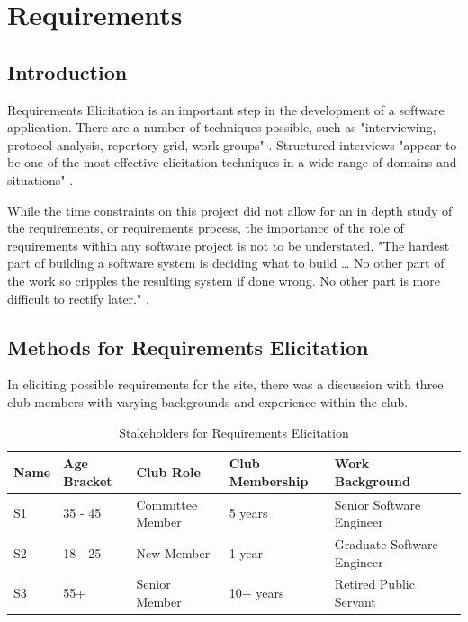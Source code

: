 \chapter{Requirements}
\label{requirements}

\section{Introduction}

Requirements Elicitation is an important step in the development of a software application. There are a number of techniques possible, such as "interviewing, protocol analysis, repertory grid, work groups" \parencite{davis2006effectiveness}. Structured interviews "appear to be one of the most effective elicitation techniques in a wide range of domains and situations" \parencite{davis2006effectiveness}. 

While the time constraints on this project did not allow for an in depth study of the requirements, or requirements process, the importance of the role of requirements within any software project is not to be understated. "The hardest part of building a software system is deciding what to build … No other part of the work so cripples the resulting system if done wrong. No other part is more difficult to rectify later." \parencite{brooks}.

\section{Methods for Requirements Elicitation}

In eliciting possible requirements for the site, there was a discussion with three club members with varying backgrounds and experience within the club.

\begin{table}[H]
\caption{Stakeholders for Requirements Elicitation}
\begin{center}
    \begin{tabular}{ | l | l | l | l | l| p{5cm} |}
    \hline
    Name & Age Bracket & Club Role & Club Membership & Work Background \\ \hline
	S1 & 35 - 45& Committee Member & 5 years & Senior Software Engineer \\ \hline
	S2 & 18 - 25 & New Member & 1 year & Graduate Software Engineer \\ \hline
	S3 & 55+ & Senior Member & 10+ years & Retired Public Servant \\ \hline
    \end{tabular}
\end{center}
\label{fig:userelicit}
\end{table}

